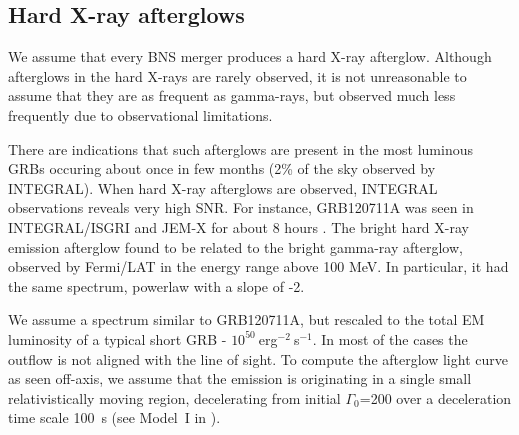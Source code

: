 \documentclass[a0,portrait]{a0poster}
\begin{document}
\begin{multicols}{2}
\subsection*{Hard X-ray afterglows}

We assume that every BNS merger produces a hard X-ray afterglow. Although
afterglows in the hard X-rays are rarely observed, it is not unreasonable to
assume that they are as frequent as gamma-rays, but observed much less
frequently due to observational limitations.

There are indications that such afterglows are present in the most luminous GRBs
occuring about once in few months (2\% of the sky observed by INTEGRAL).  When
hard X-ray afterglows are observed, INTEGRAL observations reveals very high
SNR. For instance, GRB120711A was seen in INTEGRAL/ISGRI and JEM-X for about 8
hours \cite{martincarillo14}. The bright hard X-ray emission afterglow found to
be related to the bright gamma-ray afterglow, observed by Fermi/LAT in the
energy range above 100 MeV. In particular, it had the same spectrum, powerlaw
with a slope of -2.

We assume a spectrum similar to GRB120711A, but rescaled to the total EM
luminosity of a typical short GRB - $10^{50}~$erg$^{-2}~$s$^{-1}$. In most of
the cases the outflow is not aligned with the line of sight. To compute the
afterglow light curve as seen off-axis, we assume that the emission is
originating in a single small relativistically moving region, decelerating from
initial $\Gamma_0$=200 over a deceleration time scale 100~s (see Model~I in
\cite{xxx}).



\end{multicols}
\end{document}
